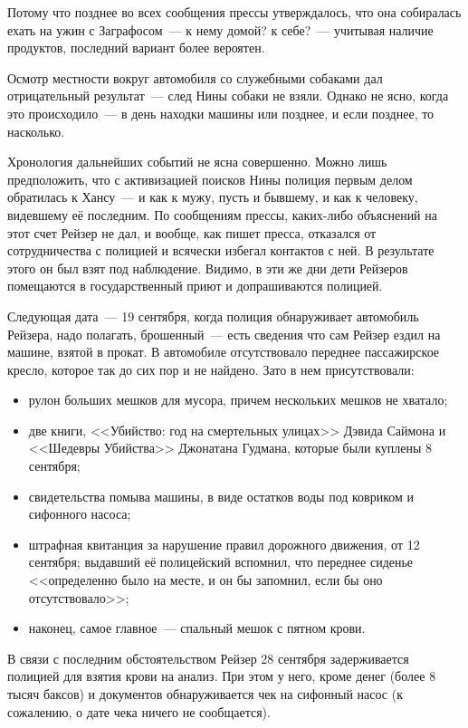 Потому что позднее во всех сообщения прессы утверждалось, что она собиралась ехать на ужин с Заграфосом~--- к нему домой? к себе?~--- учитывая наличие продуктов, последний вариант более вероятен. 

Осмотр местности вокруг автомобиля со служебными собаками дал отрицательный результат~--- след Нины собаки не взяли. Однако не ясно, когда это происходило~--- в день находки машины или позднее, и если позднее, то насколько. 

Хронология дальнейших событий не ясна совершенно. Можно лишь предположить, что с активизацией поисков Нины полиция первым делом обратилась к Хансу~--- и как к мужу, пусть и бывшему, и как к человеку, видевшему её последним. По сообщениям прессы, каких-либо объяснений на этот счет Рейзер не дал, и вообще, как пишет пресса, отказался от сотрудничества с полицией и всячески избегал контактов с ней. В результате этого он был взят под наблюдение. Видимо, в эти же дни дети Рейзеров помещаются в государственный приют и допрашиваются полицией. 

Следующая дата~--- 19 сентября, когда полиция обнаруживает автомобиль Рейзера, надо полагать, брошенный~--- есть сведения что сам Рейзер ездил на машине, взятой в прокат. В автомобиле отсутствовало переднее пассажирское кресло, которое так до сих пор и не найдено. Зато в нем присутствовали: 

\begin{itemize}
	\item рулон больших мешков для мусора, причем нескольких мешков не хватало; 
	\item две книги, <<Убийство: год на смертельных улицах>> Дэвида Саймона и <<Шедевры Убийства>> Джонатана Гудмана, которые были куплены 8 сентября; 
	\item свидетельства помыва машины, в виде остатков воды под ковриком и сифонного насоса; 
	\item штрафная квитанция за нарушение правил дорожного движения, от 12 сентября; выдавший её полицейский вспомнил, что переднее сиденье <<определенно было на месте, и он бы запомнил, если бы оно отсутствовало>>; 
	\item наконец, самое главное~--- спальный мешок с пятном крови. 
\end{itemize}


В связи с последним обстоятельством Рейзер 28 сентября задерживается полицией для взятия крови на анализ. При этом у него, кроме денег (более 8 тысяч баксов) и документов обнаруживается чек на сифонный насос (к сожалению, о дате чека ничего не сообщается). 

